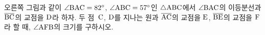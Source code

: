 \noindent\begin{minipage}[t]{0.58\linewidth}\vspace{0pt}\raggedright 오른쪽 그림과 같이 $\angle\mathrm{BAC}=82^\circ$, $\angle\mathrm{ABC}=57^\circ$인 $\triangle\mathrm{ABC}$에서 $\angle\mathrm{BAC}$의 이등분선과 $\overline{\mathrm{BC}}$의 교점을 $\mathrm{D}$라 하자. 두 점~$\mathrm{C}$, $\mathrm{D}$를 지나는 원과 $\overline{\mathrm{AC}}$의 교점을 $\mathrm{E}$, $\overline{\mathrm{BE}}$의 교점을 $\mathrm{F}$라 할 때, $\angle\mathrm{AFB}$의 크기를 구하시오.\end{minipage}\hfill\begin{minipage}[t]{0.4\linewidth}\vspace{0pt}\centering \resizebox{\ifdim\width>\linewidth\linewidth\else\width\fi}{!}{}\end{minipage}\par
